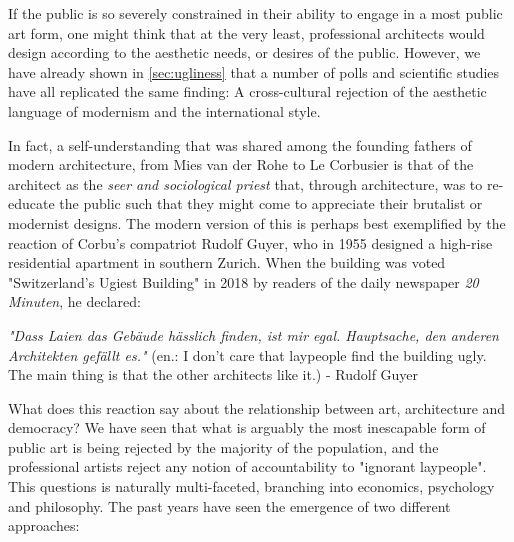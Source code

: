 \documentclass{article}
\begin{document}
\begin{multicols}{2}
If the public is so severely constrained in their ability to engage in a most public art form, one might think that at the very least, professional architects would design according to the aesthetic needs, or desires of the public. However, we have already shown in \cref{sec:ugliness} that a number of polls and scientific studies have all replicated the same finding: A cross-cultural rejection of the aesthetic language of modernism and the international style. 

In fact, a self-understanding that was shared among the founding fathers of modern architecture, from Mies van der Rohe to Le Corbusier is that of the architect as the \textit{seer and sociological priest} \cite[Sec. 4]{hughes_shock_1993} that, through architecture, was to re-educate the public such that they might come to appreciate their brutalist or modernist designs. The modern version of this is perhaps best exemplified by the reaction of Corbu's compatriot Rudolf Guyer, who in 1955 designed a high-rise residential apartment in southern Zurich. When the building was voted "Switzerland's Ugiest Building" in 2018 by readers of the daily newspaper \textit{20 Minuten}, he declared:

\textit{"Dass Laien das Gebäude hässlich finden, ist mir egal. Hauptsache, den anderen Architekten gefällt es."} (en.: I don't care that laypeople find the building ugly. The main thing is that the other architects like it.) - Rudolf Guyer \cite{noauthor_architekt_2018}



What does this reaction say about the relationship between art, architecture and democracy? We have seen that what is arguably the most inescapable form of public art is being rejected by the majority of the population, and the professional artists reject any notion of accountability to "ignorant laypeople". This questions is naturally multi-faceted, branching into economics, psychology and philosophy. The past years have seen the emergence of two different approaches:


\end{multicols}
\end{document}
